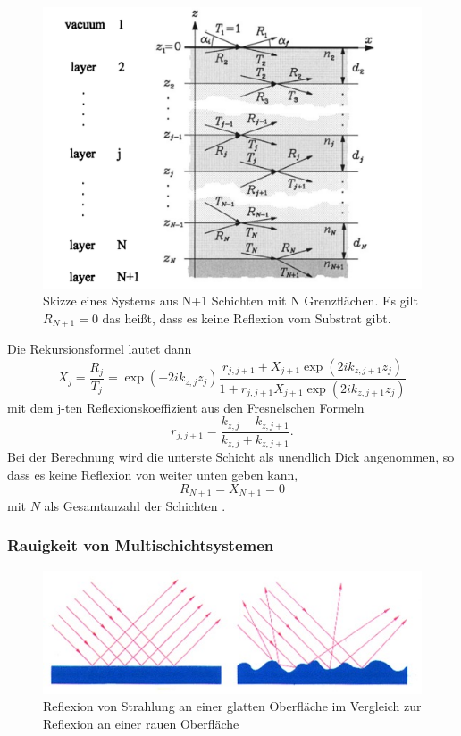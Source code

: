\begin{figure}
    \includegraphics{bilder/Multischichten.png}
    \caption{Skizze eines Systems aus N+1 Schichten mit N Grenzflächen. Es gilt $R_{N+1}=0$
    das heißt, dass es keine Reflexion vom Substrat gibt. \cite{Multischichten}}
    \label{fig:Abbildung3}
\end{figure}

Die Rekursionsformel lautet dann
\begin{equation}
    X_j=\frac{R_j}{T_j}=\exp(-2ik_{z,j}z_j)\frac{r_{j,j+1}+X_{j+1} \exp(2ik_{z,j+1}z_j)}{1+r_{j,j+1}X_{j+1} \exp(2ik_{z,j+1}z_j)}
\end{equation}
mit dem j-ten Reflexionskoeffizient aus den Fresnelschen Formeln
\begin{equation}
r_{j,j+1}=\frac{k_{z,j}-k_{z,j+1}}{k_{z,j}+k_{z,j+1}}.
\end{equation}
Bei der Berechnung wird die unterste Schicht als unendlich Dick angenommen, so dass es keine Reflexion von weiter unten geben kann, 
\begin{equation}
R_{N+1}=X_{N+1}=0 
\end{equation}
mit \(N\) als Gesamtanzahl der Schichten
\cite{Algorithmus}.

\subsubsection{Rauigkeit von Multischichtsystemen}

\begin{figure}
    \includegraphics[width=\textwidth]{bilder/Rauigkeit.jpg}
    \caption{Reflexion von Strahlung an einer glatten Oberfläche im Vergleich zur Reflexion an einer rauen Oberfläche}
    \label{fig:Abbildung4}
\end{figure}
\cite{Oberflächen}


